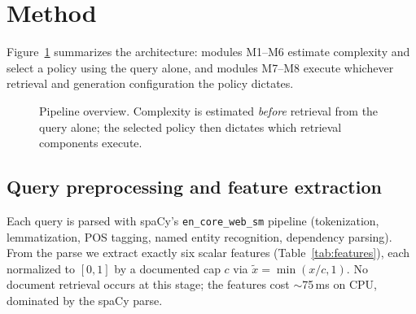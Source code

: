 \documentclass[11pt]{article}
\begin{document}
\section{Method}
\label{sec:method}

Figure~\ref{fig:pipeline} summarizes the architecture: modules M1--M6
estimate complexity and select a policy using the query alone, and modules
M7--M8 execute whichever retrieval and generation configuration the policy
dictates.

\begin{figure}[t]
\centering
{}
\caption{Pipeline overview. Complexity is estimated \emph{before} retrieval
from the query alone; the selected policy then dictates which retrieval
components execute.}
\label{fig:pipeline}
\end{figure}

\subsection{Query preprocessing and feature extraction}
\label{sec:features}

Each query is parsed with spaCy's \texttt{en\_core\_web\_sm} pipeline
\citep{honnibal2020spacy} (tokenization, lemmatization, POS tagging, named
entity recognition, dependency parsing). From the parse we extract exactly six
scalar features (Table~\ref{tab:features}), each normalized to $[0,1]$ by a
documented cap $c$ via $\tilde{x} = \min(x/c, 1)$. No document retrieval
occurs at this stage; the features cost $\sim$75\,ms on CPU, dominated by the
spaCy parse.
\end{document}
